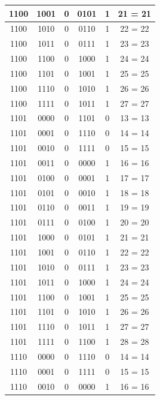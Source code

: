 \documentclass{exam}
\begin{document}
\begin{center}
\begin{longtable}{|c|c|c|c|c|c|}
                1100 & 1001 & 0 & 0101 & 1 & 21 = 21 \\ \hline
                1100 & 1010 & 0 & 0110 & 1 & 22 = 22 \\ \hline
                1100 & 1011 & 0 & 0111 & 1 & 23 = 23 \\ \hline
                1100 & 1100 & 0 & 1000 & 1 & 24 = 24 \\ \hline
                1100 & 1101 & 0 & 1001 & 1 & 25 = 25 \\ \hline
                1100 & 1110 & 0 & 1010 & 1 & 26 = 26 \\ \hline
                1100 & 1111 & 0 & 1011 & 1 & 27 = 27 \\ \hline
                1101 & 0000 & 0 & 1101 & 0 & 13 = 13 \\ \hline
                1101 & 0001 & 0 & 1110 & 0 & 14 = 14 \\ \hline
                1101 & 0010 & 0 & 1111 & 0 & 15 = 15 \\ \hline
                1101 & 0011 & 0 & 0000 & 1 & 16 = 16 \\ \hline
                1101 & 0100 & 0 & 0001 & 1 & 17 = 17 \\ \hline
                1101 & 0101 & 0 & 0010 & 1 & 18 = 18 \\ \hline
                1101 & 0110 & 0 & 0011 & 1 & 19 = 19 \\ \hline
                1101 & 0111 & 0 & 0100 & 1 & 20 = 20 \\ \hline
                1101 & 1000 & 0 & 0101 & 1 & 21 = 21 \\ \hline
                1101 & 1001 & 0 & 0110 & 1 & 22 = 22 \\ \hline
                1101 & 1010 & 0 & 0111 & 1 & 23 = 23 \\ \hline
                1101 & 1011 & 0 & 1000 & 1 & 24 = 24 \\ \hline
                1101 & 1100 & 0 & 1001 & 1 & 25 = 25 \\ \hline
                1101 & 1101 & 0 & 1010 & 1 & 26 = 26 \\ \hline
                1101 & 1110 & 0 & 1011 & 1 & 27 = 27 \\ \hline
                1101 & 1111 & 0 & 1100 & 1 & 28 = 28 \\ \hline
                1110 & 0000 & 0 & 1110 & 0 & 14 = 14 \\ \hline
                1110 & 0001 & 0 & 1111 & 0 & 15 = 15 \\ \hline
                1110 & 0010 & 0 & 0000 & 1 & 16 = 16 \\ \hline

\end{longtable}
\end{center}
\end{document}
